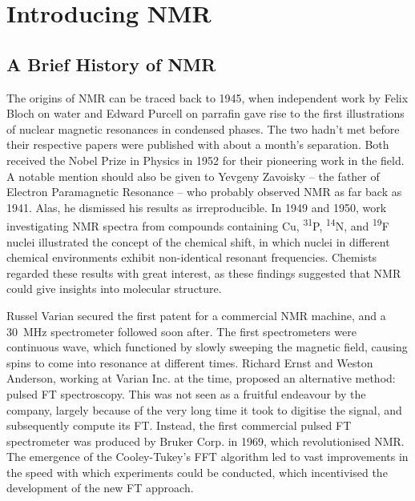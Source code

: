 \section{Introducing \acs{NMR}}

\subsection{A Brief History of NMR}
The origins of \ac{NMR} can be traced back to 1945, when independent work by
Felix Bloch on water\cite{Bloch1946} and Edward Purcell on
parrafin\cite{Purcell1946} gave rise to the first illustrations of nuclear
magnetic resonances in condensed phases. The two hadn't met before their
respective papers were published with about a month's
separation\cite{Becker1993}. Both received the Nobel Prize in Physics in 1952
for their pioneering work in the field. A notable mention should also be given
to Yevgeny Zavoisky -- the father of Electron Paramagnetic Resonance -- who
probably observed NMR as far back as 1941\cite{Eaton1998}. Alas, he dismissed
his results as irreproducible. In 1949 and 1950, work investigating \ac{NMR}
spectra from compounds containing Cu, \textsuperscript{31}P,
\textsuperscript{14}N, and \textsuperscript{19}F nuclei illustrated the concept
of the chemical shift\cite{Knight1949, Proctor1950, Dickinson1950}, in which
nuclei in different chemical environments exhibit non-identical resonant
frequencies.  Chemists regarded these results with great interest, as these
findings suggested that \ac{NMR} could give insights into molecular structure.

Russel Varian secured the first patent for a commercial \ac{NMR} machine, and a
\qty{30}{\mega\hertz} spectrometer followed soon after. The first spectrometers
were continuous wave, which functioned by slowly sweeping the magnetic field,
causing spins to come into resonance at different times. Richard Ernst and
Weston Anderson, working at Varian Inc. at the time, proposed an alternative
method: pulsed \ac{FT} spectroscopy\cite{Ernst1966}. This was not seen as a
fruitful endeavour by the company, largely because of the very long time it
took to digitise the signal, and subsequently compute its FT\cite{Freeman2015}.
Instead, the first commercial pulsed \ac{FT} spectrometer was produced by
Bruker Corp. in 1969, which revolutionised NMR. The emergence of the
Cooley-Tukey's \ac{FFT} algorithm\cite{Cooley1965} led to vast improvements in
the speed with which experiments could be conducted, which incentivised the
development of the new \ac{FT} approach.

